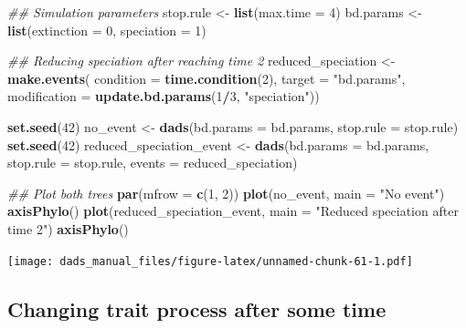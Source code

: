 \documentclass[]{book}
\newenvironment{Shaded}{\begin{snugshade}}{\end{snugshade}}
\newcommand{\CommentTok}[1]{\textcolor[rgb]{0.56,0.35,0.01}{\textit{#1}}}
\newcommand{\DataTypeTok}[1]{\textcolor[rgb]{0.13,0.29,0.53}{#1}}
\newcommand{\DecValTok}[1]{\textcolor[rgb]{0.00,0.00,0.81}{#1}}
\newcommand{\KeywordTok}[1]{\textcolor[rgb]{0.13,0.29,0.53}{\textbf{#1}}}
\newcommand{\NormalTok}[1]{#1}
\newcommand{\OperatorTok}[1]{\textcolor[rgb]{0.81,0.36,0.00}{\textbf{#1}}}
\newcommand{\StringTok}[1]{\textcolor[rgb]{0.31,0.60,0.02}{#1}}
\begin{document}
\begin{Shaded}
\begin{Highlighting}[]
\CommentTok{## Simulation parameters}
\NormalTok{stop.rule <-}\StringTok{ }\KeywordTok{list}\NormalTok{(}\DataTypeTok{max.time =} \DecValTok{4}\NormalTok{)}
\NormalTok{bd.params <-}\StringTok{ }\KeywordTok{list}\NormalTok{(}\DataTypeTok{extinction =} \DecValTok{0}\NormalTok{, }\DataTypeTok{speciation =} \DecValTok{1}\NormalTok{)}

\CommentTok{## Reducing speciation after reaching time 2}
\NormalTok{reduced_speciation <-}\StringTok{ }\KeywordTok{make.events}\NormalTok{(}
                      \DataTypeTok{condition    =} \KeywordTok{time.condition}\NormalTok{(}\DecValTok{2}\NormalTok{),}
                      \DataTypeTok{target       =} \StringTok{"bd.params"}\NormalTok{,}
                      \DataTypeTok{modification =} \KeywordTok{update.bd.params}\NormalTok{(}\DecValTok{1}\OperatorTok{/}\DecValTok{3}\NormalTok{, }\StringTok{"speciation"}\NormalTok{))}

\KeywordTok{set.seed}\NormalTok{(}\DecValTok{42}\NormalTok{)}
\NormalTok{no_event <-}\StringTok{ }\KeywordTok{dads}\NormalTok{(}\DataTypeTok{bd.params =}\NormalTok{ bd.params,}
                 \DataTypeTok{stop.rule =}\NormalTok{ stop.rule)}
\KeywordTok{set.seed}\NormalTok{(}\DecValTok{42}\NormalTok{)}
\NormalTok{reduced_speciation_event <-}\StringTok{ }\KeywordTok{dads}\NormalTok{(}\DataTypeTok{bd.params =}\NormalTok{ bd.params,}
                                 \DataTypeTok{stop.rule =}\NormalTok{ stop.rule,}
                                 \DataTypeTok{events    =}\NormalTok{ reduced_speciation)}

\CommentTok{## Plot both trees}
\KeywordTok{par}\NormalTok{(}\DataTypeTok{mfrow =} \KeywordTok{c}\NormalTok{(}\DecValTok{1}\NormalTok{, }\DecValTok{2}\NormalTok{))}
\KeywordTok{plot}\NormalTok{(no_event, }\DataTypeTok{main =} \StringTok{"No event"}\NormalTok{)}
\KeywordTok{axisPhylo}\NormalTok{()}
\KeywordTok{plot}\NormalTok{(reduced_speciation_event, }\DataTypeTok{main =} \StringTok{"Reduced speciation after time 2"}\NormalTok{)}
\KeywordTok{axisPhylo}\NormalTok{()}
\end{Highlighting}
\end{Shaded}

\texttt{[image: dads\_manual\_files/figure-latex/unnamed-chunk-61-1.pdf]}

\hypertarget{changing-trait-process-after-some-time}{%
\subsection{Changing trait process after some time}\label{changing-trait-process-after-some-time}}
\end{document}

